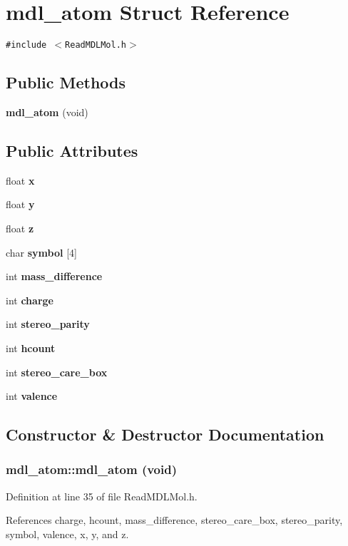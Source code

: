 \section{mdl\_\-atom  Struct Reference}
\label{structmdl__atom}
{\tt \#include $<$Read\-MDLMol.h$>$}

\subsection*{Public Methods}
\begin{CompactItemize}
\item 
{\bf mdl\_\-atom} (void)
\end{CompactItemize}
\subsection*{Public Attributes}
\begin{CompactItemize}
\item 
float {\bf x}
\item 
float {\bf y}
\item 
float {\bf z}
\item 
char {\bf symbol} [4]
\item 
int {\bf mass\_\-difference}
\item 
int {\bf charge}
\item 
int {\bf stereo\_\-parity}
\item 
int {\bf hcount}
\item 
int {\bf stereo\_\-care\_\-box}
\item 
int {\bf valence}
\end{CompactItemize}


\subsection{Constructor \& Destructor Documentation}
\subsubsection{\setlength{\rightskip}{0pt plus 5cm}mdl\_\-atom::mdl\_\-atom (void)\hspace{0.3cm}{\tt  [inline]}}\label{structmdl__atom_a0}




Definition at line 35 of file Read\-MDLMol.h.

References charge, hcount, mass\_\-difference, stereo\_\-care\_\-box, stereo\_\-parity, symbol, valence, x, y, and z.

